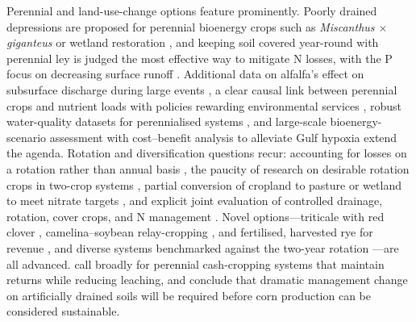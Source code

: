 \documentclass[11pt]{article}
\begin{document}
Perennial and land-use-change options feature prominently. Poorly drained
depressions are proposed for perennial bioenergy crops such as
\textit{Miscanthus $\times$ giganteus} or wetland restoration \parencite{Huang2023},
and keeping soil covered year-round with perennial ley is judged the most
effective way to mitigate N losses, with the P focus on decreasing surface
runoff \parencite{Norberg2022}. Additional data on alfalfa's effect on subsurface
discharge during large events \parencite{Arrueta2025}, a clear causal link
between perennial crops and nutrient loads with policies rewarding environmental
services \parencite{Arrueta2022}, robust water-quality datasets for perennialised
systems \parencite{Wilson2023}, and large-scale bioenergy-scenario assessment
with cost--benefit analysis to alleviate Gulf hypoxia
\parencite{Guo2018,Woodbury2018} extend the agenda. Rotation and diversification
questions recur: accounting for losses on a rotation rather than annual basis
\parencite{Zhao2016}, the paucity of research on desirable rotation crops in
two-crop systems \parencite{Pasley2021}, partial conversion of cropland to
pasture or wetland to meet nitrate targets \parencite{Randall2001,Gowda2007,Nangia2008},
and explicit joint evaluation of controlled drainage, rotation, cover crops, and
N management \parencite{Ma2007b}. Novel options---triticale with red clover
\parencite{Nance2007}, camelina--soybean relay-cropping \parencite{Emmett2022},
and fertilised, harvested rye for revenue \parencite{Malone2018,Malone2023}, and
diverse systems benchmarked against the two-year rotation \parencite{Gentry2025}
---are all advanced. \textcite{Dinnes2002} call broadly for perennial cash-cropping
systems that maintain returns while reducing leaching, and \textcite{Jaynes2001}
conclude that dramatic management change on artificially drained soils will be
required before corn production can be considered sustainable.

\printbibliography
\end{document}
